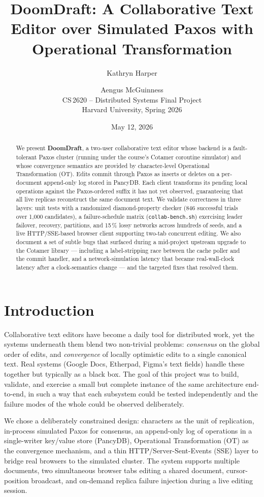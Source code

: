 \documentclass[11pt]{article}
\title{\textbf{DoomDraft: A Collaborative Text Editor over Simulated Paxos with Operational Transformation}}
\author{Kathryn Harper \and Aengus McGuinness\\[0.3em]
\small CS\,2620 -- Distributed Systems Final Project\\
\small Harvard University, Spring 2026}
\date{May 12, 2026}
\newcommand{\code}[1]{\texttt{#1}}
\begin{document}
\maketitle

\begin{abstract}
\noindent We present \textbf{DoomDraft}, a two-user collaborative text editor whose backend is a fault-tolerant Paxos cluster (running under the course's Cotamer coroutine simulator) and whose convergence semantics are provided by character-level Operational Transformation (OT). Edits commit through Paxos as inserts or deletes on a per-document append-only log stored in PancyDB. Each client transforms its pending local operations against the Paxos-ordered suffix it has not yet observed, guaranteeing that all live replicas reconstruct the same document text. We validate correctness in three layers: unit tests with a randomized diamond-property checker (846 successful trials over 1{,}000 candidates), a failure-schedule matrix (\code{collab-bench.sh}) exercising leader failover, recovery, partitions, and 15\,\% lossy networks across hundreds of seeds, and a live HTTP/SSE-based browser client supporting two-tab concurrent editing. We also document a set of subtle bugs that surfaced during a mid-project upstream upgrade to the Cotamer library --- including a label-stripping race between the cache poller and the commit handler, and a network-simulation latency that became real-wall-clock latency after a clock-semantics change --- and the targeted fixes that resolved them.
\end{abstract}

\section{Introduction}

Collaborative text editors have become a daily tool for distributed work, yet the systems underneath them blend two non-trivial problems: \emph{consensus} on the global order of edits, and \emph{convergence} of locally optimistic edits to a single canonical text. Real systems (Google Docs, Etherpad, Figma's text fields) handle these together but typically as a black box. The goal of this project was to build, validate, and exercise a small but complete instance of the same architecture end-to-end, in such a way that each subsystem could be tested independently and the failure modes of the whole could be observed deliberately.

We chose a deliberately constrained design: characters as the unit of replication, in-process simulated Paxos for consensus, an append-only log of operations in a single-writer key/value store (PancyDB), Operational Transformation (OT) as the convergence mechanism, and a thin HTTP/Server-Sent-Events (SSE) layer to bridge real browsers to the simulated cluster. The system supports multiple documents, two simultaneous browser tabs editing a shared document, cursor-position broadcast, and on-demand replica failure injection during a live editing session.
\end{document}
